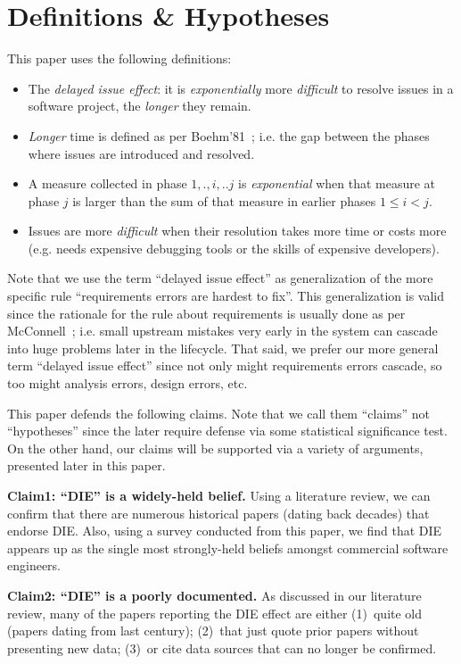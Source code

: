 \documentclass{sig-alternate}
\newcommand{\bi}{\begin{itemize}}%
\newcommand{\ei}{\end{itemize}}
\begin{document}
\section{Definitions \& Hypotheses}
This paper uses the following definitions:
\bi
\item
The {\em delayed issue effect}:   it is {\em exponentially}  more {\em difficult} to resolve  issues in a software project, the {\em longer} they remain.
\item
 {\em Longer} time is defined as per  Boehm'81~\cite{Boehm81}; i.e. the gap between the   phases where   issues are introduced and resolved.
\item
A measure collected in phase ${1,.,i,..j}$ is 
{\em exponential} when  that
   measure at phase $j$   
   is larger than the sum of that measure in 
earlier phases $1 \le i < j$. 
\item
Issues are more {\em difficult}  
when their resolution takes more time or costs more  (e.g. needs expensive
debugging tools or the skills of expensive developers).
\ei
Note that we use  the  term ``delayed issue effect'' as generalization of the
more specific rule  ``requirements errors are hardest to fix''.
This generalization is valid since the rationale for the rule about requirements
is usually done as per McConnell~\cite{mcconnell01}; i.e. small upstream mistakes very
early in the system can cascade into huge problems later in the lifecycle.
That said, we prefer our more general term ``delayed issue effect'' since not
only might requirements errors cascade, so too might analysis errors, design errors, etc.



This paper defends the  following claims. Note that we call them
``claims'' not ``hypotheses'' since the later require defense via some statistical
significance test. On the other hand, our claims will be supported via a variety
of arguments, presented later in this paper.

{\bf  Claim1: ``DIE'' is a  widely-held belief.}
Using a literature review, we can confirm that there are numerous historical papers (dating back decades)
that endorse DIE. Also, using a survey conducted from this paper, we find  that 
  DIE  appears up as the
single most strongly-held beliefs amongst commercial software engineers.

{\bf  Claim2: ``DIE'' is a poorly documented.}
 As discussed in our literature review,  many of the papers reporting the DIE
effect are either (1)~quite old (papers dating from last century);
(2)~that just quote prior papers without presenting   new data; 
(3)~or cite data sources that can no longer be
confirmed. 
\end{document}
